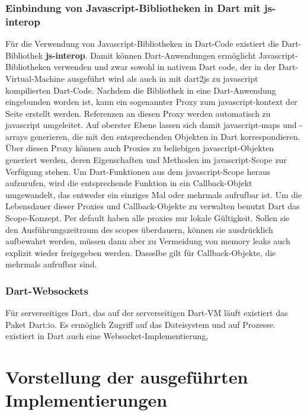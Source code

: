 \subsection{Einbindung von Javascript-Bibliotheken in Dart mit js-interop}\label{s.Einbindung von Javascript-Bibliotheken in Dart mit js-interop}
Für die Verwendung von Javascript-Bibliotheken in Dart-Code existiert die Dart-Bibliothek {\bf js-interop}. Damit können Dart-Anwendungen ermöglicht Javascript-Bibliotheken verwenden und zwar sowohl in nativem Dart code, der in der Dart-Virtual-Machine ausgeführt wird als auch in mit dart2js zu javascript kompilierten Dart-Code.
Nachdem die Bibliothek in eine Dart-Anwendung eingebunden worden ist, kann ein sogenannter Proxy zum javascript-kontext der Seite erstellt werden. Referenzen an diesen Proxy werden automatisch zu javascript umgeleitet. Auf oberster Ebene lassen sich damit javascript-maps und -arrays generieren, die mit den entsprechenden Objekten in Dart korrespondieren.
Über diesen Proxy können auch Proxies zu beliebigen javascript-Objekten generiert werden, deren Eigenschaften und Methoden im javascript-Scope zur Verfügung stehen.
Um Dart-Funktionen aus dem javascript-Scope heraus aufzurufen, wird die entsprechende Funktion in ein Callback-Objekt umgewandelt, das entweder ein einziges Mal oder mehrmals aufrufbar ist.
Um die Lebensdauer dieser Proxies und Callback-Objekte zu verwalten benutzt Dart das Scope-Konzept.
Per default haben alle proxies nur lokale Gültigkeit. Sollen sie den Ausführungszeitraum des scopes überdauern, können sie ausdrücklich aufbewahrt werden, müssen dann aber zu Vermeidung von memory leaks auch explizit wieder freigegeben werden. Dasselbe gilt für Callback-Objekte, die mehrmals aufrufbar sind.

\subsection{Dart-Websockets}
Für serverseitiges Dart, das auf der serverseitigen Dart-VM läuft existiert das Paket Dart:io. Es ermöglich Zugriff auf das Dateisystem und auf Prozesse.
   existiert in Dart auch eine Websocket-Implementierung,

\chapter{Vorstellung der ausgeführten Implementierungen}\label{s.Implementierungen}

